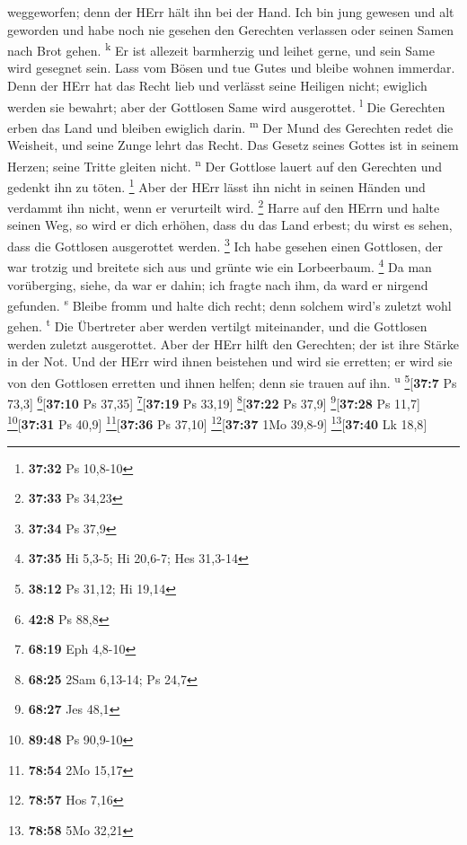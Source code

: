 weggeworfen; denn der HErr hält ihn bei der Hand.  Ich
bin jung gewesen und alt geworden und habe noch nie gesehen den
Gerechten verlassen oder seinen Samen nach Brot gehen.
\textsuperscript{k}  Er ist allezeit barmherzig und
leihet gerne, und sein Same wird gesegnet sein.  Lass vom
Bösen und tue Gutes und bleibe wohnen immerdar.  Denn der
HErr hat das Recht lieb und verlässt seine Heiligen nicht; ewiglich
werden sie bewahrt; aber der Gottlosen Same wird ausgerottet.
\textsuperscript{l}  Die Gerechten erben das Land und
bleiben ewiglich darin. \textsuperscript{m}  Der Mund des
Gerechten redet die Weisheit, und seine Zunge lehrt das Recht.
 Das Gesetz seines Gottes ist in seinem Herzen; seine
Tritte gleiten nicht. \textsuperscript{n}  Der Gottlose
lauert auf den Gerechten und gedenkt ihn zu töten. \footnote{\textbf{37:32}
  Ps 10,8-10}  Aber der HErr lässt ihn nicht in seinen
Händen und verdammt ihn nicht, wenn er verurteilt wird. \footnote{\textbf{37:33}
  Ps 34,23}  Harre auf den HErrn und halte seinen Weg, so
wird er dich erhöhen, dass du das Land erbest; du wirst es sehen, dass
die Gottlosen ausgerottet werden. \footnote{\textbf{37:34} Ps 37,9}
 Ich habe gesehen einen Gottlosen, der war trotzig und
breitete sich aus und grünte wie ein Lorbeerbaum. \footnote{\textbf{37:35}
  Hi 5,3-5; Hi 20,6-7; Hes 31,3-14}  Da man vorüberging,
siehe, da war er dahin; ich fragte nach ihm, da ward er nirgend
gefunden. \textsuperscript{s}  Bleibe fromm und halte
dich recht; denn solchem wird's zuletzt wohl gehen. \textsuperscript{t}
 Die Übertreter aber werden vertilgt miteinander, und die
Gottlosen werden zuletzt ausgerottet.  Aber der HErr
hilft den Gerechten; der ist ihre Stärke in der Not.  Und
der HErr wird ihnen beistehen und wird sie erretten; er wird sie von den
Gottlosen erretten und ihnen helfen; denn sie trauen auf ihn.
\textsuperscript{u} \footnote{\textbf{38:12} Ps 31,12; Hi 19,14}{[}\textbf{37:7}
Ps 73,3{]} \footnote{\textbf{42:8} Ps 88,8}{[}\textbf{37:10} Ps 37,35{]}
\footnote{\textbf{68:19} Eph 4,8-10}{[}\textbf{37:19} Ps 33,19{]}
\footnote{\textbf{68:25} 2Sam 6,13-14; Ps 24,7}{[}\textbf{37:22} Ps
37,9{]} \footnote{\textbf{68:27} Jes 48,1}{[}\textbf{37:28} Ps 11,7{]}
\footnote{\textbf{89:48} Ps 90,9-10}{[}\textbf{37:31} Ps 40,9{]}
\footnote{\textbf{78:54} 2Mo 15,17}{[}\textbf{37:36} Ps 37,10{]}
\footnote{\textbf{78:57} Hos 7,16}{[}\textbf{37:37} 1Mo 39,8-9{]}
\footnote{\textbf{78:58} 5Mo 32,21}{[}\textbf{37:40} Lk 18,8{]}

